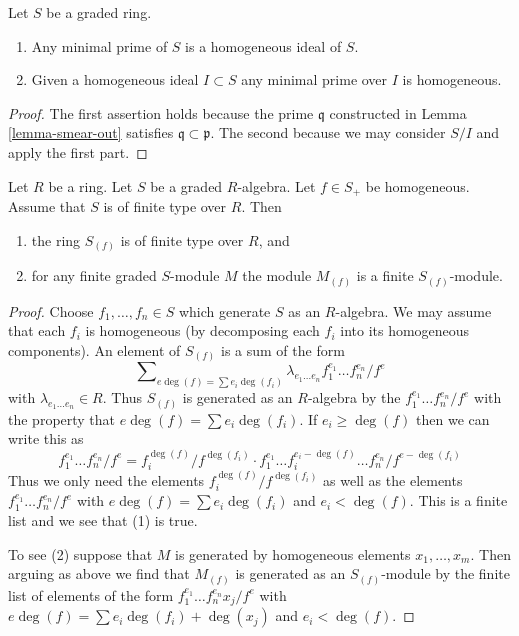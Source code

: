 \begin{lemma}
\label{lemma-graded-ring-minimal-prime}
Let $S$ be a graded ring.
\begin{enumerate}
\item Any minimal prime of $S$ is a homogeneous ideal of $S$.
\item Given a homogeneous ideal $I \subset S$ any minimal
prime over $I$ is homogeneous.
\end{enumerate}
\end{lemma}

\begin{proof}
The first assertion holds because the prime $\mathfrak q$ constructed in
Lemma \ref{lemma-smear-out} satisfies $\mathfrak q \subset \mathfrak p$.
The second because we may consider $S/I$ and apply the first part.
\end{proof}

\begin{lemma}
\label{lemma-dehomogenize-finite-type}
Let $R$ be a ring. Let $S$ be a graded $R$-algebra. Let $f \in S_{+}$
be homogeneous. Assume that $S$ is of finite type over $R$. Then
\begin{enumerate}
\item the ring $S_{(f)}$ is of finite type over $R$, and
\item for any finite graded $S$-module $M$ the module $M_{(f)}$
is a finite $S_{(f)}$-module.
\end{enumerate}
\end{lemma}

\begin{proof}
Choose $f_1, \ldots, f_n \in S$ which generate $S$ as an $R$-algebra.
We may assume that each $f_i$ is homogeneous (by decomposing each $f_i$
into its homogeneous components). An element of $S_{(f)}$ is a sum
of the form
$$
\sum\nolimits_{e\deg(f) =
\sum e_i\deg(f_i)} \lambda_{e_1 \ldots e_n} f_1^{e_1} \ldots f_n^{e_n}/f^e
$$
with $\lambda_{e_1 \ldots e_n} \in R$. Thus $S_{(f)}$ is generated
as an $R$-algebra by the $f_1^{e_1} \ldots f_n^{e_n} /f^e$ with the
property that $e\deg(f) = \sum e_i\deg(f_i)$. If $e_i \geq \deg(f)$
then we can write this as
$$
f_1^{e_1} \ldots f_n^{e_n}/f^e =
f_i^{\deg(f)}/f^{\deg(f_i)} \cdot
f_1^{e_1} \ldots f_i^{e_i - \deg(f)} \ldots f_n^{e_n}/f^{e - \deg(f_i)}
$$
Thus we only need the elements $f_i^{\deg(f)}/f^{\deg(f_i)}$ as well
as the elements $f_1^{e_1} \ldots f_n^{e_n} /f^e$ with
$e \deg(f) = \sum e_i \deg(f_i)$ and $e_i < \deg(f)$.
This is a finite list and we see that (1) is true.

\medskip\noindent
To see (2) suppose that $M$ is generated by homogeneous elements
$x_1, \ldots, x_m$. Then arguing
as above we find that $M_{(f)}$ is generated as an $S_{(f)}$-module
by the finite list of elements of the form
$f_1^{e_1} \ldots f_n^{e_n} x_j /f^e$
with $e \deg(f) = \sum e_i \deg(f_i) + \deg(x_j)$ and
$e_i < \deg(f)$.
\end{proof}

